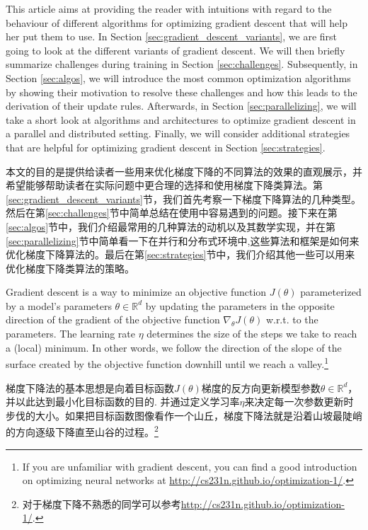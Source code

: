 \documentclass{article}
\begin{document}
This article aims at providing the reader with intuitions with regard to the behaviour of different algorithms for optimizing gradient descent that will help her put them to use. In Section \ref{sec:gradient_descent_variants}, we are first going to look at the different variants of gradient descent. We will then briefly summarize challenges during training in Section \ref{sec:challenges}. Subsequently, in Section \ref{sec:algos}, we will introduce the most common optimization algorithms by showing their motivation to resolve these challenges and how this leads to the derivation of their update rules. Afterwards, in Section \ref{sec:parallelizing}, we will take a short look at algorithms and architectures to optimize gradient descent in a parallel and distributed setting. Finally, we will consider additional strategies that are helpful for optimizing gradient descent in Section \ref{sec:strategies}.

本文的目的是提供给读者一些用来优化梯度下降的不同算法的效果的直观展示，并希望能够帮助读者在实际问题中更合理的选择和使用梯度下降类算法。第\ref{sec:gradient_descent_variants}节，我们首先考察一下梯度下降算法的几种类型。然后在第\ref{sec:challenges}节中简单总结在使用中容易遇到的问题。接下来在第\ref{sec:algos}节中，我们介绍最常用的几种算法的动机以及其数学实现，并在第\ref{sec:parallelizing}节中简单看一下在并行和分布式环境中,这些算法和框架是如何来优化梯度下降算法的。最后在第\ref{sec:strategies}节中，我们介绍其他一些可以用来优化梯度下降类算法的策略。

Gradient descent is a way to minimize an objective function $J(\theta)$ parameterized by a model's parameters $\theta \in \mathbb{R}^d$ by updating the parameters in the opposite direction of the gradient of the objective function $\nabla_\theta J(\theta)$ w.r.t. to the parameters. The learning rate $\eta$ determines the size of the steps we take to reach a (local) minimum. In other words, we follow the direction of the slope of the surface created by the objective function downhill until we reach a valley.\footnote{If you are unfamiliar with gradient descent, you can find a good introduction on optimizing neural networks at \url{http://cs231n.github.io/optimization-1/}.}

梯度下降法的基本思想是向着目标函数$J(\theta)$梯度的反方向更新模型参数$\theta \in \mathbb{R}^d$，并以此达到最小化目标函数的目的. 并通过定义学习率$\eta$来决定每一次参数更新时步伐的大小。如果把目标函数图像看作一个山丘，梯度下降法就是沿着山坡最陡峭的方向逐级下降直至山谷的过程。\footnote{对于梯度下降不熟悉的同学可以参考\url{http://cs231n.github.io/optimization-1/}.}
\end{document}
